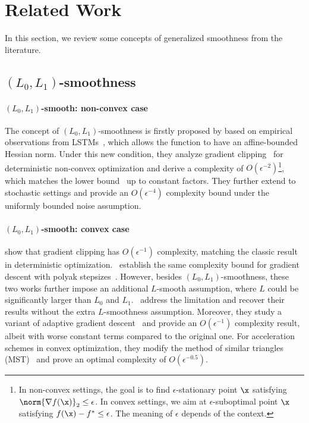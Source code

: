\section{Related Work\label{sec:related-work}
}

In this section, we review some concepts of generalized smoothness from the literature.

\subsection{$(L_0,L_1)$-smoothness}

\paragraph{$(L_0,L_1)$-smooth: non-convex case} 
The concept of $(L_0,L_1)$-smoothness is firstly proposed by \citet{Zhang2020Why} based on empirical observations from LSTMs~\citep{merity2018regularizing}, which allows the function to have an affine-bounded Hessian norm. Under this new condition, they analyze gradient clipping~\citep{mikolov2012statistical,pmlr-v28-pascanu13} for deterministic non-convex optimization and derive a complexity of $O(\epsilon^{-2})$\footnote{In non-convex settings, the goal is to find $\epsilon$-stationary point $\x$ satisfying $\norm{\nabla f(\x)}_2\le\epsilon$. In convex settings, we aim at $\epsilon$-suboptimal point $\x$ satisfying $f(\x)-f^*\le\epsilon$. The meaning of $\epsilon$ depends of the context.}, which matches the lower bound~\citep{carmon2020lower} up to constant factors. They further extend to stochastic settings and provide an $O(\epsilon^{-4})$ complexity bound under the uniformly bounded noise assumption.

\paragraph{$(L_0,L_1)$-smooth: convex case}
\citet{pmlr-v202-koloskova23a} show that gradient clipping has $O(\epsilon^{-1})$ complexity, matching the classic result in deterministic optimization.~\citet{takezawa2024polyak} establish the same complexity bound for gradient descent with polyak stepsizes~\citep{polyak1987introduction}. However, besides $(L_0,L_1)$-smoothness, these two works further impose an additional $L$-smooth assumption, where $L$ could be significantly larger than $L_0$ and $L_1$.~\citet{gorbunov2024methods} address the limitation and recover their results without the extra $L$-smoothness assumption. Moreover, they study a variant of adaptive gradient descent~\citep{malitsky2020adaptive} and provide an $O(\epsilon^{-1})$ complexity result, albeit with worse constant terms compared to the original one. For acceleration schemes in convex optimization, they modify the method of similar triangles (MST)~\citep{gasnikov2018universal} and prove an optimal complexity of $O(\epsilon^{-0.5})$.

